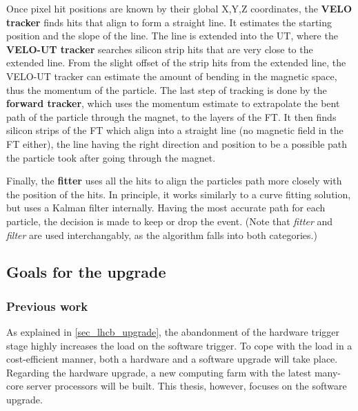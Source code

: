 \documentclass[12pt]{article}
\begin{document}
Once pixel hit positions are known by their global X,Y,Z coordinates, the \textbf{VELO tracker} finds hits that align to form a straight line. It estimates the starting position and the slope of the line. The line is extended into the UT, where the \textbf{VELO-UT tracker} searches silicon strip hits that are very close to the extended line. From the slight offset of the strip hits from the extended line, the VELO-UT tracker can estimate the amount of bending in the magnetic space, thus the momentum of the particle. The last step of tracking is done by the \textbf{forward tracker}, which uses the momentum estimate to extrapolate the bent path of the particle through the magnet, to the layers of the FT. It then finds silicon strips of the FT which align into a straight line (no magnetic field in the FT either), the line having the right direction and position to be a possible path the particle took after going through the magnet.

Finally, the \textbf{fitter} uses all the hits to align the particles path more closely with the position of the hits. In principle, it works similarly to a curve fitting solution, but uses a Kalman filter\cite{kalman_filter_wiki}\cite{kalman_filter_lhcb} internally. Having the most accurate path for each particle, the decision is made to keep or drop the event. (Note that \textit{fitter} and \textit{filter} are used interchangably, as the algorithm falls into both categories.)


\subsection{Goals for the upgrade}

\subsubsection{Previous work}

As explained in \ref{sec_lhcb_upgrade}, the abandonment of the hardware trigger stage highly increases the load on the software trigger. To cope with the load in a cost-efficient manner, both a hardware and a software upgrade will take place. Regarding the hardware upgrade, a new computing farm with the latest many-core server processors will be built. This thesis, however, focuses on the software upgrade.
\end{document}
